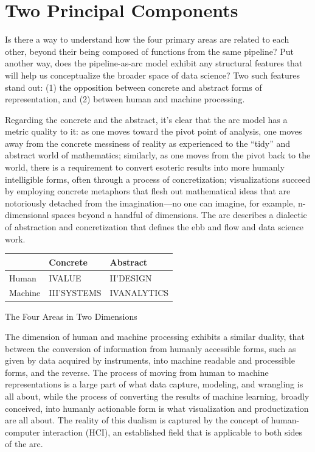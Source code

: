 \documentclass[
  letterpaper,
]{report}
\begin{document}
\hypertarget{two-principal-components}{%
\chapter{Two Principal Components}\label{two-principal-components}}

Is there a way to understand how the four primary areas are related to
each other, beyond their being composed of functions from the same
pipeline? Put another way, does the pipeline-as-arc model exhibit any
structural features that will help us conceptualize the broader space of
data science? Two such features stand out: (1) the opposition between
concrete and abstract forms of representation, and (2) between human and
machine processing.

Regarding the concrete and the abstract, it's clear that the arc model
has a metric quality to it: as one moves toward the pivot point of
analysis, one moves away from the concrete messiness of reality as
experienced to the ``tidy'' and abstract world of mathematics;
similarly, as one moves from the pivot back to the world, there is a
requirement to convert esoteric results into more humanly intelligible
forms, often through a process of concretization; visualizations succeed
by employing concrete metaphors that flesh out mathematical ideas that
are notoriously detached from the imagination---no one can imagine, for
example, n-dimensional spaces beyond a handful of dimensions. The arc
describes a dialectic of abstraction and concretization that defines the
ebb and flow and data science work.

\begin{longtable}[]{@{}lll@{}}
\toprule()
~ & Concrete & Abstract \\
\midrule()
\endhead
Human & IVALUE & II'DESIGN \\
Machine & III'SYSTEMS & IVANALYTICS \\
\bottomrule()
\end{longtable}

The Four Areas in Two Dimensions

The dimension of human and machine processing exhibits a similar
duality, that between the conversion of information from humanly
accessible forms, such as given by data acquired by instruments, into
machine readable and processible forms, and the reverse. The process of
moving from human to machine representations is a large part of what
data capture, modeling, and wrangling is all about, while the process of
converting the results of machine learning, broadly conceived, into
humanly actionable form is what visualization and productization are all
about. The reality of this dualism is captured by the concept of
human-computer interaction (HCI), an established field that is
applicable to both sides of the arc.
\end{document}
